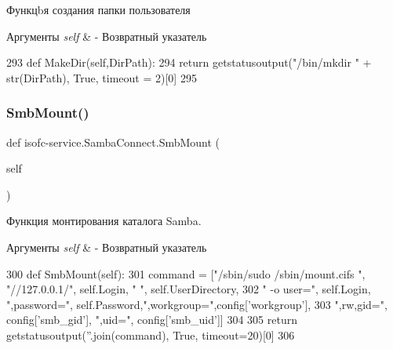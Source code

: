 Функцbя создания папки пользователя 


\begin{DoxyParams}{Аргументы}
{\em self} & -\/ Возвратный указатель \\
\hline
\end{DoxyParams}

\begin{DoxyCode}
293     \textcolor{keyword}{def }MakeDir(self,DirPath):
294         \textcolor{keywordflow}{return} getstatusoutput(\textcolor{stringliteral}{"/bin/mkdir "} + str(DirPath), \textcolor{keyword}{True}, timeout = 2)[0]
295 
\end{DoxyCode}
\mbox{\label{classisofc-service_1_1SambaConnect_a95a21d63db6f88fd43eb6a8958bb174d}} 
\subsubsection{\texorpdfstring{Smb\+Mount()}{SmbMount()}}
{\footnotesize\ttfamily def isofc-\/service.\+Samba\+Connect.\+Smb\+Mount (\begin{DoxyParamCaption}\item[{}]{self }\end{DoxyParamCaption})}



Функция монтирования каталога Samba. 


\begin{DoxyParams}{Аргументы}
{\em self} & -\/ Возвратный указатель \\
\hline
\end{DoxyParams}

\begin{DoxyCode}
300     \textcolor{keyword}{def }SmbMount(self):
301         command = [\textcolor{stringliteral}{"/sbin/sudo /sbin/mount.cifs "}, \textcolor{stringliteral}{"//127.0.0.1/"}, self.Login, \textcolor{stringliteral}{" "}, self.UserDirectory,
302                 \textcolor{stringliteral}{" -o user="}, self.Login, \textcolor{stringliteral}{",password="}, self.Password,\textcolor{stringliteral}{",workgroup="},config[\textcolor{stringliteral}{'workgroup'}],
303                 \textcolor{stringliteral}{",rw,gid="}, config[\textcolor{stringliteral}{'smb\_gid'}], \textcolor{stringliteral}{",uid="}, config[\textcolor{stringliteral}{'smb\_uid'}]]
304 
305         \textcolor{keywordflow}{return} getstatusoutput(\textcolor{stringliteral}{''}.join(command), \textcolor{keyword}{True}, timeout=20)[0]
306 
\end{DoxyCode}
\mbox{\label{classisofc-service_1_1SambaConnect_a3979f8cc410218f1a71d44f340d1cdf8}} 
